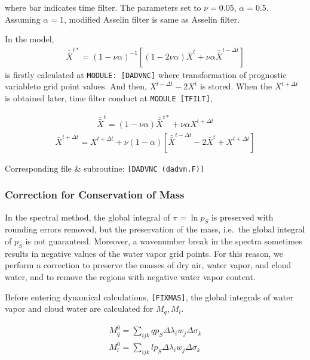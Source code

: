where bar indicates time filter. The parameters set to \(\nu=0.05\), \(\alpha=0.5\). Assuming \(\alpha=1\), modified Asselin filter is same as Asselin filter.

In the model, \begin{eqnarray}
 \bar{\bar{X}}^{t*} = (1-\nu\alpha)^{-1}[(1-2\nu\alpha)\bar{X}^t +\nu\alpha \bar{\bar{X}}^{t-\Delta t} ]
\end{eqnarray} is firstly calculated at \texttt{MODULE:\ {[}DADVNC{]}} where transformation of prognostic variableto grid point values. And then, \(X^{t-\Delta t}-2X^t\) is stored. When the \(X^{t+\Delta t}\) is
obtained later, time filter conduct at \texttt{MODULE\ {[}TFILT{]}},

\begin{eqnarray}
 \bar{\bar{X}}^{t} = (1-\nu\alpha)\bar{\bar{X}}^{t*} +\nu\alpha X^{t+\Delta t}
\end{eqnarray} \begin{eqnarray}
\bar{X}^{t+\Delta t} = X^{t+\Delta t} + \nu (1-\alpha)[ \bar{\bar{X}}^{t-\Delta t} - 2\bar{X}^{t} + X^{t+\Delta t}]
 \end{eqnarray}

Corresponding file \& subroutine: \texttt{{[}DADVNC\ (dadvn.F){]}}

\hypertarget{correction-for-conservation-of-mass}{%
\subsubsection{Correction for Conservation of Mass}\label{correction-for-conservation-of-mass}}

In the spectral method, the global integral of \(\pi = \ln p_S\) is preserved with rounding errors removed, but the preservation of the mass, i.e.~the global integral of \(p_S\) is not guaranteed.
Moreover, a wavenumber break in the spectra sometimes results in negative values of the water vapor grid points. For this reason, we perform a correction to preserve the masses of dry air, water
vapor, and cloud water, and to remove the regions with negative water vapor content.

Before entering dynamical calculations, \texttt{{[}FIXMAS{]}}, the global integrals of water vapor and cloud water are calculated for \(M_q, M_l\).

\begin{eqnarray}
  M_q^0  =  \sum_{ijk} q p_S  \Delta\lambda_i w_j \Delta\sigma_k  \\
  M_l^0  =  \sum_{ijk} l p_S  \Delta\lambda_i w_j \Delta\sigma_k
\end{eqnarray}

